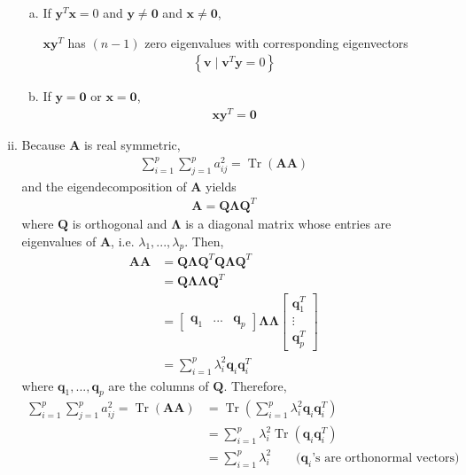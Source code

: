 \documentclass[12pt]{article}
\DeclareMathOperator{\Tr}{Tr}
\begin{document}
\begin{enumerate}
\begin{enumerate}[(i)]
\begin{enumerate}[a)]
\item
If $\boldsymbol{y}^T\boldsymbol{x} = 0$ and $\boldsymbol{y} \ne \boldsymbol{0}$ and $\boldsymbol{x} \ne \boldsymbol{0}$,

$\boldsymbol{x}\boldsymbol{y}^T$ has $(n-1)$ zero eigenvalues with corresponding eigenvectors
\begin{gather}
    \left\{\boldsymbol{v} \;|\; \boldsymbol{v}^T \boldsymbol{y} = 0 \right\}
\end{gather}

\item 
If $\boldsymbol{y} = \boldsymbol{0}$ or $\boldsymbol{x} = \boldsymbol{0}$,
\begin{align}
    \boldsymbol{x}\boldsymbol{y}^T = \boldsymbol{0}
\end{align}

\end{enumerate}

\item
Because $\boldsymbol{A}$ is real symmetric,
\begin{gather}
    \sum_{i=1}^p \sum_{j=1}^p a_{ij}^2 = \Tr(\boldsymbol{A} \boldsymbol{A})
\end{gather}
and the eigendecomposition of $\boldsymbol{A}$ yields
\begin{gather}
    \boldsymbol{A} = \boldsymbol{Q}\boldsymbol{\Lambda}\boldsymbol{Q}^T
\end{gather}
where $\boldsymbol{Q}$ is orthogonal and $\boldsymbol{\Lambda}$ is a diagonal matrix whose entries are eigenvalues of $\boldsymbol{A}$, i.e. $\lambda_1,...,\lambda_p$. Then,
\begin{align}
    \boldsymbol{A} \boldsymbol{A} & = \boldsymbol{Q}\boldsymbol{\Lambda}\boldsymbol{Q}^T\boldsymbol{Q}\boldsymbol{\Lambda}\boldsymbol{Q}^T \\
    & = \boldsymbol{Q}\boldsymbol{\Lambda}\boldsymbol{\Lambda}\boldsymbol{Q}^T \\
    & = \begin{bmatrix}
    \boldsymbol{q}_1 & ... & \boldsymbol{q}_p
    \end{bmatrix}
    \boldsymbol{\Lambda}\boldsymbol{\Lambda}
    \begin{bmatrix}
    \boldsymbol{q}_1^T \\
    \vdots \\
    \boldsymbol{q}_p^T
    \end{bmatrix} \\
    & = \sum_{i=1}^p \lambda_i^2 \boldsymbol{q}_i \boldsymbol{q}_i^T
\end{align}
where $\boldsymbol{q}_1, ... ,\boldsymbol{q}_p$ are the columns of $\boldsymbol{Q}$. Therefore,
\begin{align}
\sum_{i=1}^p \sum_{j=1}^p a_{ij}^2 = \Tr(\boldsymbol{A}\boldsymbol{A}) 
& = \Tr\left( \sum_{i=1}^p \lambda_i^2 \boldsymbol{q}_i \boldsymbol{q}_i^T \right) \\
& = \sum_{i=1}^p \lambda_i^2  \Tr\left(  \boldsymbol{q}_i \boldsymbol{q}_i^T \right) \\
& = \sum_{i=1}^p \lambda_i^2 \qquad \text{($\boldsymbol{q}_i$'s are orthonormal vectors)}
\end{align}


\end{enumerate}
\end{enumerate}
\end{document}
